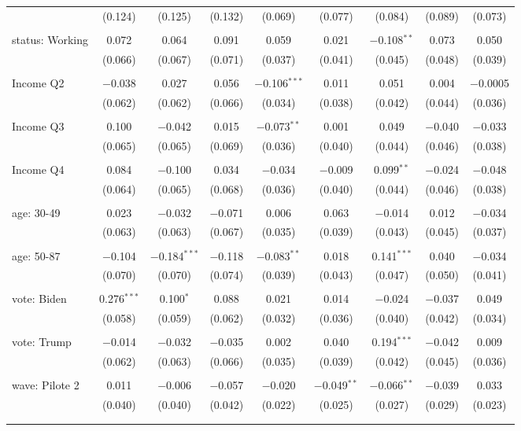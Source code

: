 \begin{tabular}{@{\extracolsep{5pt}}lcccccccc}
  & (0.124) & (0.125) & (0.132) & (0.069) & (0.077) & (0.084) & (0.089) & (0.073) \\ 
  & & & & & & & & \\ 
 status: Working & 0.072 & 0.064 & 0.091 & 0.059 & 0.021 & $-$0.108$^{**}$ & 0.073 & 0.050 \\ 
  & (0.066) & (0.067) & (0.071) & (0.037) & (0.041) & (0.045) & (0.048) & (0.039) \\ 
  & & & & & & & & \\ 
 Income Q2 & $-$0.038 & 0.027 & 0.056 & $-$0.106$^{***}$ & 0.011 & 0.051 & 0.004 & $-$0.0005 \\ 
  & (0.062) & (0.062) & (0.066) & (0.034) & (0.038) & (0.042) & (0.044) & (0.036) \\ 
  & & & & & & & & \\ 
 Income Q3 & 0.100 & $-$0.042 & 0.015 & $-$0.073$^{**}$ & 0.001 & 0.049 & $-$0.040 & $-$0.033 \\ 
  & (0.065) & (0.065) & (0.069) & (0.036) & (0.040) & (0.044) & (0.046) & (0.038) \\ 
  & & & & & & & & \\ 
 Income Q4 & 0.084 & $-$0.100 & 0.034 & $-$0.034 & $-$0.009 & 0.099$^{**}$ & $-$0.024 & $-$0.048 \\ 
  & (0.064) & (0.065) & (0.068) & (0.036) & (0.040) & (0.044) & (0.046) & (0.038) \\ 
  & & & & & & & & \\ 
 age: 30-49 & 0.023 & $-$0.032 & $-$0.071 & 0.006 & 0.063 & $-$0.014 & 0.012 & $-$0.034 \\ 
  & (0.063) & (0.063) & (0.067) & (0.035) & (0.039) & (0.043) & (0.045) & (0.037) \\ 
  & & & & & & & & \\ 
 age: 50-87 & $-$0.104 & $-$0.184$^{***}$ & $-$0.118 & $-$0.083$^{**}$ & 0.018 & 0.141$^{***}$ & 0.040 & $-$0.034 \\ 
  & (0.070) & (0.070) & (0.074) & (0.039) & (0.043) & (0.047) & (0.050) & (0.041) \\ 
  & & & & & & & & \\ 
 vote: Biden & 0.276$^{***}$ & 0.100$^{*}$ & 0.088 & 0.021 & 0.014 & $-$0.024 & $-$0.037 & 0.049 \\ 
  & (0.058) & (0.059) & (0.062) & (0.032) & (0.036) & (0.040) & (0.042) & (0.034) \\ 
  & & & & & & & & \\ 
 vote: Trump & $-$0.014 & $-$0.032 & $-$0.035 & 0.002 & 0.040 & 0.194$^{***}$ & $-$0.042 & 0.009 \\ 
  & (0.062) & (0.063) & (0.066) & (0.035) & (0.039) & (0.042) & (0.045) & (0.036) \\ 
  & & & & & & & & \\ 
 wave: Pilote 2 & 0.011 & $-$0.006 & $-$0.057 & $-$0.020 & $-$0.049$^{**}$ & $-$0.066$^{**}$ & $-$0.039 & 0.033 \\ 
  & (0.040) & (0.040) & (0.042) & (0.022) & (0.025) & (0.027) & (0.029) & (0.023) \\ 
  & & & & & & & & \\ 
\hline \\[-1.8ex] 


\end{tabular}
